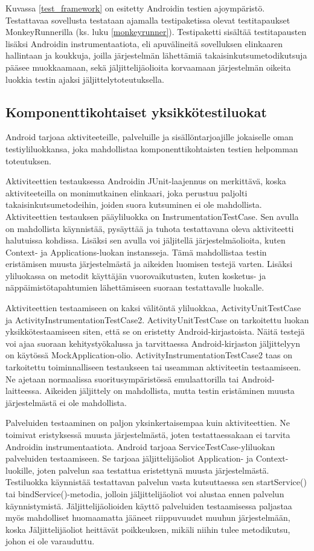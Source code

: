 Kuvassa \ref{test_framework} on esitetty Androidin testien ajoympäristö. Testattavaa sovellusta testataan ajamalla testipaketissa olevat testitapaukset MonkeyRunnerilla (ks. luku \ref{monkeyrunner}). Testipaketti sisältää testitapausten lisäksi Androidin instrumentaatiota, eli apuvälineitä sovelluksen elinkaaren hallintaan ja koukkuja, joilla järjestelmän lähettämiä takaisinkutsumetodikutsuja pääsee muokkaamaan, sekä jäljittelijäolioita korvaamaan järjestelmän oikeita luokkia testin ajaksi jäljittelytoteutuksella. \cite{android}

\subsection{Komponenttikohtaiset yksikkötestiluokat}

Android tarjoaa aktiviteeteille, palveluille ja sisällöntarjoajille jokaiselle oman testiyliluokkansa, joka mahdollistaa komponenttikohtaisten testien helpomman toteutuksen.

Aktiviteettien testauksessa Androidin JUnit-laajennus on merkittävä, koska aktiviteeteilla on monimutkainen elinkaari, joka perustuu paljolti takaisinkutsumetodeihin, joiden suora kutsuminen ei ole mahdollista. Aktiviteettien testauksen pääyliluokka on InstrumentationTestCase. Sen avulla on mahdollista käynnistää, pysäyttää ja tuhota testattavana oleva aktiviteetti halutuissa kohdissa. Lisäksi sen avulla voi jäljitellä järjestelmäolioita, kuten Context- ja Applications-luokan instansseja. Tämä mahdollistaa testin eristämisen muusta järjestelmästä ja aikeiden luomisen testejä varten. Lisäksi yliluokassa on metodit käyttäjän vuorovaikutusten, kuten kosketus- ja näppäimistötapahtumien lähettämiseen suoraan testattavalle luokalle.

Aktiviteettien testaamiseen on kaksi välitöntä yliluokkaa, ActivityUnitTestCase ja ActivityInstrumentationTestCase2. ActivityUnitTestCase on tarkoitettu luokan yksikkötestaamiseen siten, että se on eristetty Android-kirjastoista. Näitä testejä voi ajaa suoraan kehitystyökalussa ja tarvittaessa Android-kirjaston jäljittelyyn on käytössä MockApplication-olio. ActivityInstrumentationTestCase2 taas on tarkoitettu toiminnalliseen testaukseen tai useamman aktiviteetin testaamiseen. Ne ajetaan normaalissa suoritusympäristössä emulaattorilla tai Android-laitteessa. Aikeiden jäljittely on mahdollista, mutta testin eristäminen muusta järjestelmästä ei ole mahdollista.

Palveluiden testaaminen on paljon yksinkertaisempaa kuin aktiviteettien. Ne toimivat eristyksessä muusta järjestelmästä, joten testattaessakaan ei tarvita Androidin instrumentaatiota. Android tarjoaa ServiceTestCase-yliluokan palveluiden testaamiseen. Se tarjoaa jäljittelijäoliot Application- ja Context-luokille, joten palvelun saa testattua eristettynä muusta järjestelmästä. Testiluokka käynnistää testattavan palvelun vasta kutsuttaessa sen startService() tai bindService()-metodia, jolloin jäljittelijäoliot voi alustaa ennen palvelun käynnistymistä. Jäljittelijäolioiden käyttö palveluiden testaamisessa paljastaa myös mahdolliset huomaamatta jääneet riippuvuudet muuhun järjestelmään, koska Jäljittelijäoliot heittävät poikkeuksen, mikäli niihin tulee metodikutsu, johon ei ole varauduttu.


